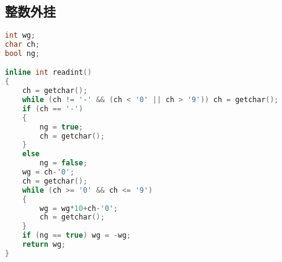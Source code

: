 \subsection{整数外挂}
    \begin{lstlisting}[language=c++]
int wg;
char ch;
bool ng;

inline int readint()
{
    ch = getchar();
    while (ch != '-' && (ch < '0' || ch > '9')) ch = getchar();
    if (ch == '-')
    {
        ng = true;
        ch = getchar();
    }
    else
        ng = false;
    wg = ch-'0';
    ch = getchar();
    while (ch >= '0' && ch <= '9')
    {
        wg = wg*10+ch-'0';
        ch = getchar();
    }
    if (ng == true) wg = -wg;
    return wg;
}
    \end{lstlisting} 